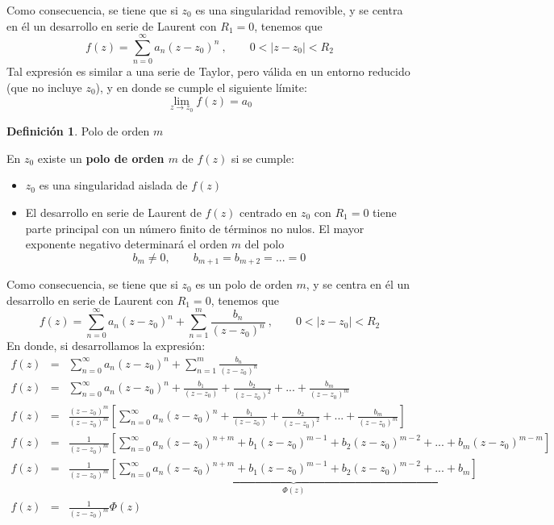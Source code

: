\documentclass[12pt]{article}
\theoremstyle{definition}
\newtheorem{definition}{Definici\'on}[section]
\theoremstyle{theorem}
\theoremstyle{corolary}
\theoremstyle{method}
\begin{document}
Como consecuencia, se tiene que si $z_0$ es una singularidad removible, y se centra en \'el un desarrollo en serie de Laurent con $R_1=0$, tenemos que $$f(z)=\sum\limits_{n=0}^{\infty}a_n(z-z_0)^n\ , \qquad 0<|z-z_0|<R_2$$
Tal expresi\'on es similar a una serie de Taylor, pero v\'alida en un entorno reducido (que no incluye $z_0$), y en donde se cumple el siguiente l\'imite: $$\lim\limits_{z\rightarrow z_0}f(z)=a_0$$

\colorbox{yellow!40!white!80}{\parbox{\linewidth}{
\theoremstyle{definition}
\begin{definition}{Polo de orden $m$}

En $z_0$ existe un \textbf{polo de orden $m$} de $f(z)$ si se cumple:
\begin{itemize}
	\item $z_0$ es una singularidad aislada de $f(z)$
	\item El desarrollo en serie de Laurent de $f(z)$ centrado en $z_0$ con $R_1=0$ tiene parte principal con un n\'umero finito de t\'erminos no nulos. El mayor exponente negativo determinar\'a el orden $m$ del polo $$b_m\neq 0,\qquad b_{m+1}=b_{m+2}=...=0$$
\end{itemize}
\end{definition}}}
\linebreak
\linebreak

Como consecuencia, se tiene que si $z_0$ es un polo de orden $m$, y se centra en \'el un desarrollo en serie de Laurent con $R_1=0$, tenemos que $$f(z)=\sum\limits_{n=0}^{\infty}a_n(z-z_0)^n+\sum\limits_{n=1}^{m}\frac{b_n}{(z-z_0)^n}\ , \qquad 0<|z-z_0|<R_2$$
En donde, si desarrollamos la expresi\'on:
\begin{eqnarray*}
f(z)&=&\sum\limits_{n=0}^{\infty}a_n(z-z_0)^n+\sum\limits_{n=1}^{m}\frac{b_n}{(z-z_0)^n}\\
f(z)&=&\sum\limits_{n=0}^{\infty}a_n(z-z_0)^n+\frac{b_1}{(z-z_0)}+\frac{b_2}{(z-z_0)^2}+...+\frac{b_m}{(z-z_0)^m}\\
f(z)&=&\frac{(z-z_0)^m}{(z-z_0)^m} \left[\sum\limits_{n=0}^{\infty}a_n(z-z_0)^n+\frac{b_1}{(z-z_0)}+\frac{b_2}{(z-z_0)^2}+...+\frac{b_m}{(z-z_0)^m}\right]\\ 
f(z)&=&\frac{1}{(z-z_0)^m} \left[\sum\limits_{n=0}^{\infty}a_n(z-z_0)^{n+m}+b_1(z-z_0)^{m-1}+b_2(z-z_0)^{m-2}+...+b_m(z-z_0)^{m-m}\right]\\
f(z)&=&\frac{1}{(z-z_0)^m} \underbrace{\left[\sum\limits_{n=0}^{\infty}a_n(z-z_0)^{n+m}+b_1(z-z_0)^{m-1}+b_2(z-z_0)^{m-2}+...+b_m\right]}_{\Phi(z)}\\
f(z)&=& \frac{1}{(z-z_0)^m} \Phi(z)
\end{eqnarray*}
 
\end{document}
